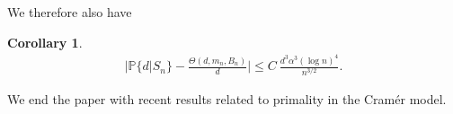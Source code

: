 \documentclass[11pt,draft,reqno]{amsart}
\newtheorem{corollary}[theorem]{Corollary}
\theoremstyle{definition}
\theoremstyle{remarks}
\numberwithin{equation}{section}
\def \a{{\alpha}}
\def\P{{\mathcal P}}
\def\P{{\mathbb P}}
\begin{document}
 We therefore also have
\begin{corollary}
\begin{eqnarray*}\Big|\P\{d|S_n\}-\frac{\Theta (d,m_n,B_n)}{d}\Big|\le C\ \frac{d^3 \a^3(\log n)^4}{n^{3/2}}  .
\end{eqnarray*}
\end{corollary}



We end  the paper with recent results related to   primality in the Cram\'er model.
\end{document}
